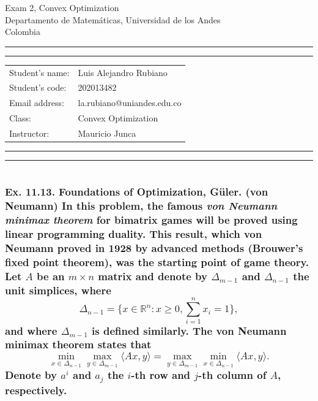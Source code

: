 \documentclass[10pt]{article}
\makeatletter
\newcommand{\studentname}{Luis Alejandro Rubiano}
\newcommand{\studentnumber}{202013482}
\newcommand{\researchcentre}{la.rubiano@uniandes.edu.co}
\newcommand{\projecttitle}{Convex Optimization}
\newcommand{\supervisor}{Mauricio Junca}
\makeatother
\begin{document}
\begin{center}
{\Huge{Exam 2, Convex Optimization}} \\
\vspace{2mm}
{\Large{Departamento de Matemáticas, Universidad de los Andes}} \\
\vspace{1mm}
{\Large{Colombia}}
\end{center}

\vspace{5mm}
\hrule
\vspace{1mm}
\hrule

\vspace{3mm}
\begin{tabular}{ll} 
Student's name:           	        & {\studentname}   \\ 
Student's code: 	        & {\studentnumber} \\ 
Email address: 	        & {\researchcentre}  \\ 
Class: 	& {\projecttitle}  \\ 
Instructor: 	    & {\supervisor}  \\ 
\end{tabular}

\vspace{3mm}
\hrule
\vspace{1mm}
\hrule

\hfill \break %

\part{}

\section{Ex. 11.13. Foundations of Optimization, Güler.
\textbf{(von Neumann)} In this problem, the famous 
\textit{von Neumann minimax theorem} for bimatrix games will be proved 
using linear programming duality. This result, which von Neumann proved in 
1928 by advanced methods (Brouwer’s fixed point theorem), was the starting point of game theory.\\
Let $A$ be an $m \times n$ matrix and denote by $\Delta_{m-1}$ and $\Delta_{n-1}$ the unit simplices, where 
$$\Delta_{n-1} = \{x \in \mathbb{R}^n: x \geq 0, \sum_{i=1}^{n} x_i = 1\},$$
and where $\Delta_{m-1}$ is defined similarly. The von Neumann minimax theorem states that
$$\min_{x \in \Delta_{n-1}} \max_{y \in \Delta_{m-1}} \langle Ax, y \rangle = \max_{y \in \Delta_{m-1}} \min_{x \in \Delta_{n-1}} \langle Ax, y \rangle.$$
Denote by $a^i$ and $a_j$ the $i$-th row and $j$-th column of $A$, respectively.}
\end{document}
